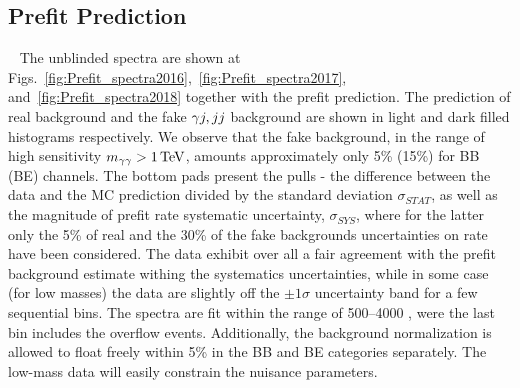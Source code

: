 \subsection{Prefit Prediction}~\label{sec:Prefit}
The unblinded \mgg spectra are shown at Figs.~\ref{fig:Prefit_spectra2016},~\ref{fig:Prefit_spectra2017}, and~\ref{fig:Prefit_spectra2018} together with the prefit prediction. The prediction of real \gmgm background and the fake $\gamma j,jj$ background are shown in light and dark filled histograms respectively.
We observe that the fake background, in the range of high sensitivity $m_{\gamma\gamma}>1\,\text{Te\hspace{-.08em}V}$, amounts approximately only 5\% (15\%) for BB (BE) channels. 
The bottom pads present the pulls - the difference between the data and the MC prediction divided by the standard deviation $\sigma_{STAT}$, as well as the magnitude of prefit rate systematic uncertainty, $\sigma_{SYS}$, where for the latter only the 5\% of real and the 30\% of the fake backgrounds uncertainties on rate have been considered.
The data exhibit over all a fair agreement with the prefit background estimate withing the systematics uncertainties, while in some case (for low masses) the data are slightly off the $\pm1\sigma$ uncertainty band for a few sequential bins. The spectra are fit within the range of 500--4000 \GeV, were the last bin includes the overflow events. Additionally, the \mgg background normalization is allowed to float freely within 5\% in the BB and BE categories separately. The low-mass data will easily constrain the nuisance parameters.

